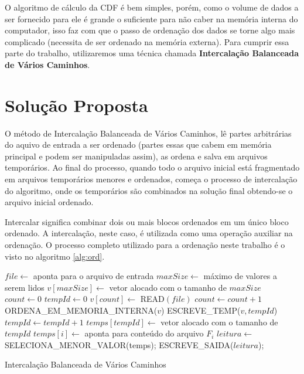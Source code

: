 \documentclass[12pt]{article}
\begin{document}
O algoritmo de cálculo da CDF é bem simples, porém, como o volume de dados a ser
fornecido para ele é grande o suficiente para não caber na memória interna do
computador, isso faz com que o passo de ordenação dos dados se torne algo mais
complicado (necessita de ser ordenado na memória externa). Para cumprir essa parte
do trabalho, utilizaremos uma técnica chamada \textbf{Intercalação Balanceada de 
Vários Caminhos}.

\section{Solução Proposta}
\label{solucao_proposta}

O método de Intercalação Balanceada de Vários Caminhos, lê partes arbitrárias do 
aquivo de entrada a ser ordenado (partes essas que cabem em memória principal e 
podem ser manipuladas assim), as ordena e salva em arquivos temporários. Ao final 
do processo, quando todo o arquivo inicial está fragmentado em arquivos temporários
menores e ordenados, começa o processo de intercalação do algoritmo, onde os 
temporários são combinados na solução final obtendo-se o arquivo inicial ordenado.

Intercalar significa combinar dois ou mais blocos ordenados em um único bloco ordenado.
A intercalação, neste caso, é utilizada como uma operação auxiliar na ordenação. O 
processo completo utilizado para a ordenação neste trabalho é o visto no algoritmo 
\ref{alg:ord}.

\begin{algorithm}[h!]
\label{alg:ord}
\begin{footnotesize}

$file \longleftarrow$ aponta para o arquivo de entrada\;
$maxSize \longleftarrow$ máximo de valores a serem lidos\;
$v[maxSize] \longleftarrow$ vetor alocado com o tamanho de $maxSize$\;
$count \longleftarrow 0$\;
$tempId \longleftarrow 0$\;
{
	{
		$v[count] \longleftarrow$ READ$(file)$\;
		$count \longleftarrow count + 1$\;
	}
	ORDENA\_EM\_MEMORIA\_INTERNA($v$)\;
	ESCREVE\_TEMP($v, tempId$)\;
	$tempId \longleftarrow tempId + 1$\;
}
$temps[tempId] \longleftarrow$ vetor alocado com o tamanho de $tempId$\;
{
	$temps[i] \longleftarrow$ aponta para conteúdo do arquivo $F_{i}$\;
}
{
	$leitura \longleftarrow$ SELECIONA\_MENOR\_VALOR(temps);
	ESCREVE\_SAIDA($leitura$);
}

\caption{Intercalação Balanceada de Vários Caminhos}
\end{footnotesize}
\end{algorithm}
\end{document}
